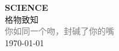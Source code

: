 \vspace*{\fill}
\begin{center}
    \textcolor{red!50}{\Huge\textbf{SCIENCE}} \\[1em]
    \textcolor{red!60!pink}{\Large 格物致知} \\[2em]
    \textcolor{gray}{\large 你如同一个吻，封碱了你的嘴} \\[1em]
    \today
\end{center}
\vspace*{\fill}
\clearpage


\clearpage

\clearpage

\clearpage

\clearpage



